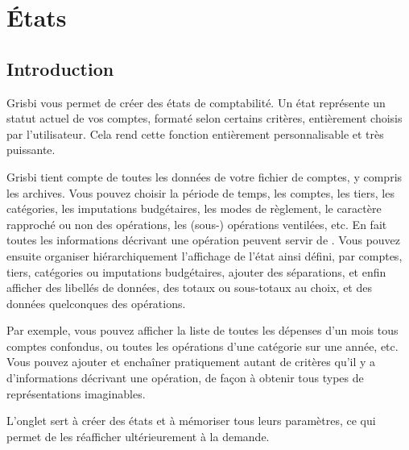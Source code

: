 
\chapter{États\label{reports}}


\section{Introduction\label{reports-intro}}


Grisbi vous permet de créer des états de comptabilité. Un état représente un statut actuel de vos comptes, formaté selon certains critères, entièrement choisis par l'utilisateur. Cela rend cette fonction entièrement personnalisable et très puissante.

Grisbi tient compte de toutes les données de votre fichier de comptes, y compris les archives. Vous pouvez choisir la période de temps, les comptes, les tiers, les catégories, les imputations budgétaires, les modes de règlement, le caractère rapproché ou non des opérations, les (sous-) opérations ventilées, etc. En fait toutes les informations décrivant une opération peuvent servir de . Vous pouvez ensuite organiser hiérarchiquement l'affichage de l'état ainsi défini, par comptes, tiers, catégories ou imputations budgétaires, ajouter des séparations, et enfin afficher des libellés de données, des totaux ou sous-totaux au choix, et des données quelconques des opérations.

Par exemple, vous pouvez afficher la liste de toutes les dépenses d'un mois tous comptes confondus, ou toutes les opérations d'une catégorie sur une année, etc. Vous pouvez ajouter et enchaîner pratiquement autant de critères qu'il y a d'informations décrivant une opération, de façon à obtenir tous types de représentations imaginables.

L'onglet  sert à créer des états et à mémoriser tous leurs paramètres, ce qui permet de les réafficher ultérieurement à la demande.

